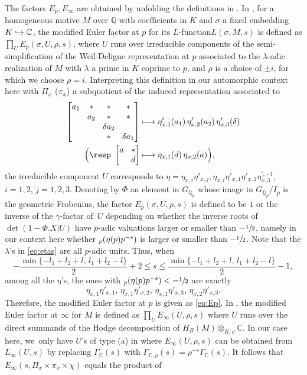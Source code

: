 \documentclass[JEP,XML,SOM,Unicode,published]{cedram}
\newcommand{\NoChangel}[1]{%
\expandafter\let\csname old\string#1\endcsname=#1
\let#1=\relax
\newcommand{#1}{\mathop{\mathcode`l="716C\csname old\string#1\endcsname\mathcode`l="7160}\displaylimits}%
}
\newcommand\mto{\mathchoice{\longmapsto}{\mapsto}{\mapsto}{\mapsto}}
\newcommand\hto{\mathrel{\lhook\joinrel\to}}
\newcommand{\Lfunction}{$L$\nobreakdash-func\-tion\xspace}
\theoremstyle{plain}
\theoremstyle{remark}
\newcommand{\bC}{\mathbb{C}}
\newcommand{\bQ}{\mathbb{Q}}
\newcommand{\val}{\mathrm{val}}\NoChangel{\val}
\begin{document}
The factors $E_p,E_\infty$ are obtained by unfolding the definitions in \cite{CoPerrin,Coates}. In \cite[p.\,163]{Coates}, for a homogeneous motive $M$ over $\bQ$ with coefficients in $K$ and $\sigma$ a fixed embedding $K\hto\bC$, the modified Euler factor at $p$ for its \Lfunction $L(\sigma,M,s)$ is defined as $\prod\nolimits_{U} E_p(\sigma,U,\rho,s)$, where $U$ runs over irreducible components of the semi-simplification of the Weil-Deligne representation at $p$ associated to the $\lambda$-adic realization of $M$ with $\lambda$ a prime in $K$ coprime to $p$, and $\rho$ is a choice of $\pm i$, for which we choose $\rho=i$. Interpreting this definition in our automorphic context here with $\Pi_x$ (\resp $\pi_x$) a subquotient of the induced representation associated to
\begin{align*}\arraycolsep4.5pt
\begin{bmatrix} a_1&\ast&\ast&\ast\\& a_2&\ast&\ast\\ &&\delta a_2\\&&\ast&\delta a_1\end{bmatrix}&\mto \eta'_{x,1}(a_1)\,\eta'_{x,2}(a_2)\,\eta'_{x,3}(\delta)\\
\arraycolsep4.5pt
\Bigl(\text{\resp }\begin{bmatrix}a&\ast\\&d\end{bmatrix}&\mto \eta_{x,1}(d)\,\eta_{x,2}(a)\Bigr),
\end{align*}
the irreducible component $U$ corresponds to $\eta=\eta_{x,i}\eta'_{x,j},\eta_{x,i}\eta'_{x,1}\eta'_{x,2}\eta^{\prime,-1}_{x,3}$, $i=1,2$, $j=1,2,3$. Denoting by $\Phi$ an element in $G_{\bQ_p}$ whose image in $G_{\bQ_p}/I_p$ is the geometric Frobenius, the factor $E_p(\sigma,U,\rho,s)$ is defined to be $1$ or the inverse of the $\gamma$-factor of~$U$ depending on whether the inverse roots of $\det(1-\Phi.X|U)$ have $p$-adic valuations larger or smaller than $-\sfrac{1}{2}$, namely in our context here whether $\val_p(\eta(p)p^{-s})$ is larger or smaller than $-\sfrac{1}{2}$. Note that the $\lambda$'s in \eqref{eq:etas} are all $p$-adic units. Thus, when
\[
-\frac{\min\{-l_1+l_2+l,\,l_1+l_2-l\}}{2}+2 \leq s\leq \frac{\min\{-l_1+l_2+l,\,l_1+l_2-l\}}{2}-1,
\]
among all the $\eta$'s, the ones with $\val_p(\eta(p)p^{-s})<-\sfrac{1}{2}$ are exactly
\[
\eta_{x,1}\eta'_{x,1},\,\eta_{x,1}\eta'_{x,2},\,\eta_{x,1}\eta'_{x,3},\,\eta_{x,2}\eta'_{x,3}.
\]
Therefore, the modified Euler factor at $p$ is given as \eqref{eq:Ep}. In \cite[(38) on p.\,157]{Coates}, the modified Euler factor at $\infty$ for $M$ is defined as $\prod_U E_\infty(U,\rho,s)$ where $U$ runs over the direct summands of the Hodge decomposition of $H_B(M)\otimes_{K,\sigma}\bC$. In our case here, we~only have $U$'s of type (a) in \loccit where $E_\infty(U,\rho,s)$ can be obtained from $L_\infty(U,s)$ by replacing $\Gamma_\bC(s)$ with $\Gamma_{\bC,\rho}(s)=\rho^{-s}\Gamma_\bC(s)$. It follows that \hbox{$E_\infty(s,\Pi_x\times\pi_x\times\chi)$} equals the product of\enlargethispage{-2\baselineskip}
\end{document}
